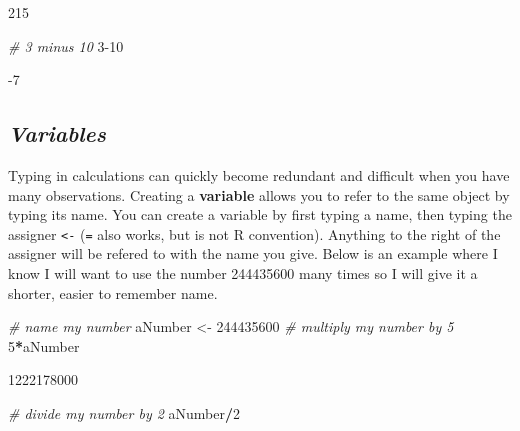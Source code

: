 \documentclass[
]{book}
\newenvironment{Shaded}{\begin{snugshade}}{\end{snugshade}}
\newcommand{\CommentTok}[1]{\textcolor[rgb]{0.56,0.35,0.01}{\textit{#1}}}
\newcommand{\DecValTok}[1]{\textcolor[rgb]{0.00,0.00,0.81}{#1}}
\newcommand{\NormalTok}[1]{#1}
\newcommand{\OtherTok}[1]{\textcolor[rgb]{0.56,0.35,0.01}{#1}}
\newcommand{\SpecialCharTok}[1]{\textcolor[rgb]{0.81,0.36,0.00}{\textbf{#1}}}
\theoremstyle{definition}
\theoremstyle{definition}
\theoremstyle{definition}
\theoremstyle{definition}
\theoremstyle{remark}
\begin{document}
\begin{Shaded}
\begin{Highlighting}[]
\NormalTok{[1] 215}
\end{Highlighting}
\end{Shaded}

\begin{Shaded}
\begin{Highlighting}[]
\CommentTok{\# 3 minus 10}
\DecValTok{3{-}10}
\end{Highlighting}
\end{Shaded}

\begin{Shaded}
\begin{Highlighting}[]
\NormalTok{[1] {-}7}
\end{Highlighting}
\end{Shaded}

\hypertarget{variables}{%
\subsection{\texorpdfstring{\emph{Variables}}{Variables}}\label{variables}}

Typing in calculations can quickly become redundant and difficult when you have many observations. Creating a \textbf{variable} allows you to refer to the same object by typing its name. You can create a variable by first typing a name, then typing the assigner \texttt{\textless{}-} (\texttt{=} also works, but is not R convention). Anything to the right of the assigner will be refered to with the name you give. Below is an example where I know I will want to use the number 244435600 many times so I will give it a shorter, easier to remember name.

\begin{Shaded}
\begin{Highlighting}[]
\CommentTok{\# name my number}
\NormalTok{aNumber }\OtherTok{\textless{}{-}} \DecValTok{244435600}
\CommentTok{\# multiply my number by 5}
\DecValTok{5}\SpecialCharTok{*}\NormalTok{aNumber}
\end{Highlighting}
\end{Shaded}

\begin{Shaded}
\begin{Highlighting}[]
\NormalTok{[1] 1222178000}
\end{Highlighting}
\end{Shaded}

\begin{Shaded}
\begin{Highlighting}[]
\CommentTok{\# divide my number by 2}
\NormalTok{aNumber}\SpecialCharTok{/}\DecValTok{2}
\end{Highlighting}
\end{Shaded}
\end{document}
